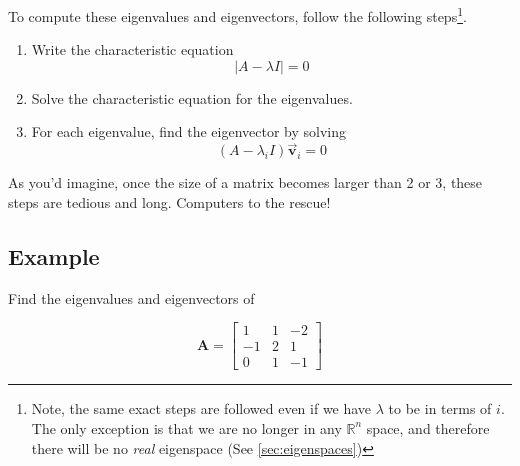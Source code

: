 \documentclass[12pt, landscape, twocolumn]{article}
\newcommand{\ma}[0]{\mathbf{A} }        %
\let\oldvec\vec
\renewcommand{\vec}[1]{\oldvec{\mathbf{ #1 } } }                    %
\begin{document}
To compute these eigenvalues and eigenvectors, follow the following steps\footnote{Note, the same exact steps are followed even if we have $\lambda$ to be in terms of $i$. The only exception is that we are no longer in any $\mathbb{R}^n$ space, and therefore there will be no \textit{real} eigenspace (See \eqref{sec:eigenspaces})}.

\begin{enumerate}
    \item Write the characteristic equation
        \[ \lvert A - \lambda I \rvert = 0 \]
    \item Solve the characteristic equation for the eigenvalues.
    \item For each eigenvalue, find the eigenvector by solving
        \[ \left( A - \lambda_i I \right) \vec{v}_i = 0 \]
\end{enumerate}

As you'd imagine, once the size of a matrix becomes larger than 2 or 3, these steps are tedious and long. Computers to the rescue!

    \subsection{Example}
    Find the eigenvalues and eigenvectors of

        \[ \ma =
            \left[ \begin{array}{rrr}
                1 & 1 & -2\\
                -1 & 2 & 1\\
                0 & 1 & -1
            \end{array} \right] \]
\end{document}
